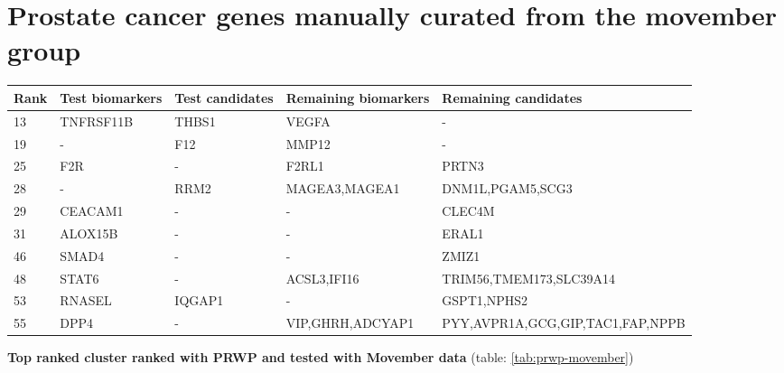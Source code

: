 \section{Prostate cancer genes manually curated from the movember group}
\begin{sidewaystable}
    \begin{tabular}{|l|l|l|l|l|}
        \hline
        \textbf{Rank}
        & \textbf{Test biomarkers}
        & \textbf{Test candidates}
        & \textbf{Remaining biomarkers}
        & \textbf{Remaining candidates} \\
        \hline
        13	& TNFRSF11B	& THBS1	& VEGFA	& - \\
        \hline
        19	& -	& F12	& MMP12	& - \\
        \hline
        25	& F2R	& -	& F2RL1	& PRTN3 \\
        \hline
        28	& -	& RRM2	& MAGEA3,MAGEA1	& DNM1L,PGAM5,SCG3 \\
        \hline
        29	& CEACAM1	& -	& -	& CLEC4M \\
        \hline
        31	& ALOX15B	& -	& -	& ERAL1 \\
        \hline
        46	& SMAD4	& -	& -	& ZMIZ1 \\
        \hline
        48	& STAT6	& -	& ACSL3,IFI16	& TRIM56,TMEM173,SLC39A14 \\
        \hline
        53	& RNASEL	& IQGAP1	& -	& GSPT1,NPHS2 \\
        \hline
        55	& DPP4	& -	& VIP,GHRH,ADCYAP1	& PYY,AVPR1A,GCG,GIP,TAC1,FAP,NPPB \\
        \hline
    \end{tabular}
    \caption{iRefWeb network ranked with PRWP and movember data - matched 254 
    test genes from movember data set out of 271 possible}
    \label{tab:prwp-movember}
\end{sidewaystable}

\textbf{Top ranked cluster ranked with PRWP and tested with Movember data}
(table: \ref{tab:prwp-movember})

